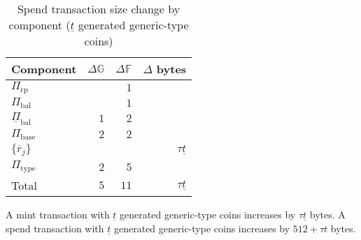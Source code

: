 \documentclass{article}
\newcommand{\G}{\mathbb{G}}
\newcommand{\F}{\mathbb{F}}
\begin{document}
\begin{table}[ht]
    \centering
    \begin{tabular}{|l|r|r|r|}
    \hline
    \textbf{Component} & \textbf{$\Delta\G$} & \textbf{$\Delta\F$} & \textbf{$\Delta$ bytes} \\
    \hline
    $\Pi_{\text{rp}}$ & & $1$ & \\
    $\Pi_{\text{bal}}$ & & $1$ & \\
    $\underline{\Pi}_{\text{bal}}$ & $1$ & $2$ & \\
    $\Pi_{\text{base}}$ & $2$ & $2$ & \\
    $\{\overline{r}_j\}$ & & & $\tau\underline{t}$ \\
    $\Pi_{\text{type}}$ & $2$ & $5$ & \\
    \hline
    Total & $5$ & $11$ & $\tau \underline{t}$ \\
    \hline
    \end{tabular}
    \caption{Spend transaction size change by component ($\underline{t}$ generated generic-type coins)}
    \label{table:size_spend}
\end{table}

A mint transaction with $\underline{t}$ generated generic-type coins increases by $\tau\underline{t}$ bytes.
A spend transaction with $\underline{t}$ generated generic-type coins increases by $512 + \tau t$ bytes.




\end{document}
